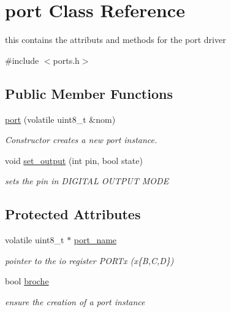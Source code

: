 \hypertarget{classport}{\section{port Class Reference}
\label{classport}
}


this contains the attributs and methods for the port driver  




{\ttfamily \#include $<$ports.\-h$>$}

\subsection*{Public Member Functions}
\begin{DoxyCompactItemize}
\item 
\hyperlink{classport_ac802d7443286c5e9e5b6b18e6d92b803}{port} (volatile uint8\-\_\-t \&nom)
\begin{DoxyCompactList}\small\item\em Constructor creates a new port instance. \end{DoxyCompactList}\item 
void \hyperlink{classport_ac7a0ac9d9d0c29ddcd6561830a1f848a}{set\-\_\-output} (int pin, bool state)
\begin{DoxyCompactList}\small\item\em sets the pin in D\-I\-G\-I\-T\-A\-L O\-U\-T\-P\-U\-T M\-O\-D\-E \end{DoxyCompactList}\end{DoxyCompactItemize}
\subsection*{Protected Attributes}
\begin{DoxyCompactItemize}
\item 
volatile uint8\-\_\-t $\ast$ \hyperlink{classport_a7d360768f8ba1c3f2c65c0c72bafaf54}{port\-\_\-name}
\begin{DoxyCompactList}\small\item\em pointer to the io register P\-O\-R\-Tx (x\{B,C,D\}) \end{DoxyCompactList}\item 
bool \hyperlink{classport_a296e1dfa3d9c7e5b8fa707355a523f6c}{broche}
\begin{DoxyCompactList}\small\item\em ensure the creation of a port instance \end{DoxyCompactList}\end{DoxyCompactItemize}



